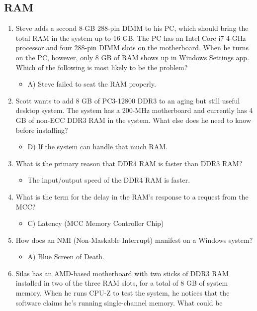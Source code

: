 \documentclass{article}
\begin{document}
\subsection{RAM}
\begin{enumerate}
    \item Steve adds a second 8-GB 288-pin DIMM to his PC, which should
bring the total RAM in the system up to 16 GB. The PC has an Intel
Core i7 4-GHz processor and four 288-pin DIMM slots on the
motherboard. When he turns on the PC, however, only 8 GB of RAM
shows up in Windows Settings app. Which of the following is most
likely to be the problem?
      \begin{itemize}
          \item A) Steve failed to seat the RAM properly.
      \end{itemize}
    \item Scott wants to add 8 GB of PC3-12800 DDR3 to an aging but still
useful desktop system. The system has a 200-MHz motherboard and
currently has 4 GB of non-ECC DDR3 RAM in the system. What else
does he need to know before installing?
    \begin{itemize}
        \item D) If the system can handle that much RAM.
    \end{itemize}
    \item What is the primary reason that DDR4 RAM is faster than DDR3
RAM?
    \begin{itemize}
        \item The input/output speed of the DDR4 RAM is faster.
    \end{itemize}
    \item What is the term for the delay in the RAM’s response to a request
from the MCC?
    \begin{itemize}
        \item C) Latency (MCC Memory Controller Chip) 
    \end{itemize}
    \item How does an NMI (Non-Maskable Interrupt) manifest on a Windows system?
    \begin{itemize}
        \item A) Blue Screen of Death.
    \end{itemize}
    \item Silas has an AMD-based motherboard with two sticks of DDR3 RAM
installed in two of the three RAM slots, for a total of 8 GB of system
memory. When he runs CPU-Z to test the system, he notices that the
software claims he’s running single-channel memory. What could be

\end{enumerate}
\end{document}
